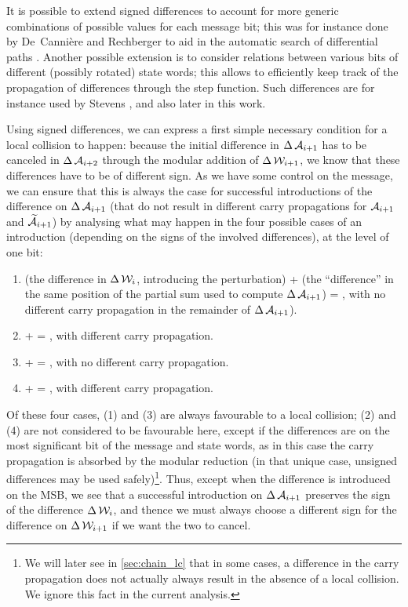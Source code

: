 It is possible to extend signed differences to account for more generic combinations of possible
values for each message bit; this was for instance done by De~Canni\`ere and Rechberger to aid in the automatic search of differential paths \cite{DBLP:conf/asiacrypt/CanniereR06}.
Another possible extension  is to consider relations between various bits of different (possibly rotated) state words;
this allows to efficiently keep track of the propagation of differences through the step function. Such differences are for instance used by Stevens \cite{DBLP:conf/eurocrypt/Stevens13},
and also later in this work.

\medskip

Using signed differences, we can express a first simple necessary condition for a local collision to happen: because the initial difference in $\operatorname{\Delta}\mathcal{A}_{i+1}$ has to be
canceled in $\operatorname{\Delta}\mathcal{A}_{i+2}$ through the modular addition of $\operatorname{\Delta}\mathcal{W}_{i+1}$, we know that these differences have to be of different sign. As we have some control on the
message, we can ensure that this is always the case for successful introductions of the difference on $\operatorname{\Delta}\mathcal{A}_{i+1}$ (that do not result in different carry propagations for
$\mathcal{A}_{i+1}$ and $\mathcal{\widetilde A}_{i+1}$) by analysing what may happen in the four possible cases  of an introduction (depending on the signs of the involved differences), at the level of one bit:
\begin{enumerate}
\item \onediffu (the difference in $\operatorname{\Delta}\mathcal{W}_i$, introducing the perturbation) + \nodiffz (the ``difference'' in the same position of the partial sum used to compute $\operatorname{\Delta}\mathcal{A}_{i+1}$) = \onediffu,
with no different carry propagation in the remainder of $\operatorname{\Delta}\mathcal{A}_{i+1}$).
\item \onediffu  + \nodiffo = \onediffd, with different carry propagation.
\item \onediffd  + \nodiffz = \onediffd, with no different carry propagation.
\item \onediffd  + \nodiffo = \onediffu, with different carry propagation.
\end{enumerate}
Of these four cases, (1) and (3) are always favourable to a local collision; (2) and (4) are not considered to be favourable here, except if the differences are on the most significant bit
of the message and state words, as in this case the carry propagation is absorbed by the modular reduction (in that unique case, unsigned differences may be used safely)\footnote{We will
later see in \autoref{sec:chain_lc} that in some cases, a difference in the carry propagation does not actually always result in the absence of a local collision. We ignore this fact in the current analysis.}.
Thus, except when the difference is introduced on the MSB, we see that
a successful introduction on $\operatorname{\Delta}\mathcal{A}_{i+1}$ preserves the sign of the difference $\operatorname{\Delta}\mathcal{W}_i$, and thence we must always
choose a different sign for the difference on $\operatorname{\Delta}\mathcal{W}_{i+1}$ if we want the two to cancel.

